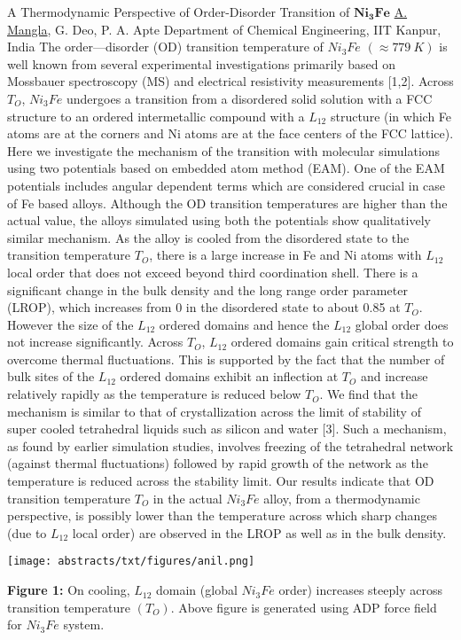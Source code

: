 
    \begin{abstract_online}{A Thermodynamic Perspective of Order-Disorder Transition of $\mathbf{Ni_3Fe}$ }{%
        \underline{A. Mangla}, G. Deo, P. A. Apte}{%
        }{%
        Department of Chemical Engineering, IIT Kanpur, India}
    The order—disorder (OD) transition temperature of $Ni_3Fe$ $(\approx 779 \ K)$ is well known from several experimental investigations primarily based on Mossbauer spectroscopy (MS) and electrical resistivity measurements [1,2]. Across $T_O$, $Ni_3Fe$ undergoes a transition from a disordered solid solution with a FCC structure to an ordered intermetallic compound with a $L_{12}$ structure (in which Fe atoms are at the corners and Ni atoms are at the face centers of the FCC lattice).  Here we investigate the mechanism of the transition with molecular simulations using two potentials based on embedded atom method (EAM).  One of the EAM potentials includes angular dependent terms which are considered crucial in case of Fe based alloys.  Although the OD transition temperatures are higher than the actual value, the alloys simulated using both the potentials show qualitatively similar mechanism.   As the alloy is cooled from the disordered state to the transition temperature $T_O$, there is a large increase in Fe and Ni atoms with $L_{12}$ local order that does not exceed beyond third coordination shell. There is a significant change in the bulk density and the long range order parameter (LROP), which increases from 0 in the disordered state to about 0.85 at $T_O$.  However the size of the $L_{12}$ ordered domains and hence the $L_{12}$ global order does not increase significantly.  Across $T_O$, $L_{12}$ ordered domains gain critical strength to overcome thermal fluctuations.   This is supported by the fact that the number of bulk sites of the $L_{12}$ ordered domains exhibit an inflection at $T_O$ and increase relatively rapidly as the temperature is reduced below $T_O$.  We find that the mechanism is similar to that of crystallization across the limit of stability of super cooled tetrahedral liquids such as silicon and water [3]. Such a mechanism, as found by earlier simulation studies, involves freezing of the tetrahedral network (against thermal fluctuations) followed by rapid growth of the network as the temperature is reduced across the stability limit.  Our results indicate that OD transition temperature $T_O$ in the actual $Ni_3Fe$ alloy, from a thermodynamic perspective, is possibly lower than the temperature across which sharp changes (due to $L_{12}$ local order) are observed in the LROP as well as in the bulk density.  \begin{center}  \texttt{[image: abstracts/txt/figures/anil.png]}  \caption{\textbf{Figure 1:} On cooling, $L_{12}$ domain (global $Ni_3Fe$ order) increases steeply across transition temperature $(T_O)$. Above figure is generated using ADP force field for $Ni_3Fe$ system.}  \end{center} 
    

\end{abstract_online}
